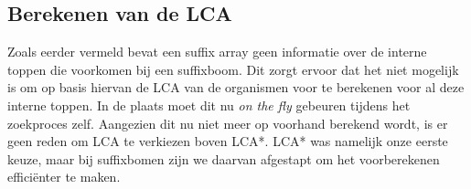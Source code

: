 \subsection{Berekenen van de LCA}\label{subsec:berekenen-van-de-lca}
Zoals eerder vermeld bevat een suffix array geen informatie over de interne toppen die voorkomen bij een suffixboom.
Dit zorgt ervoor dat het niet mogelijk is om op basis hiervan de LCA van de organismen voor te berekenen voor al deze interne toppen.
In de plaats moet dit nu \textit{on the fly} gebeuren tijdens het zoekproces zelf.
Aangezien dit nu niet meer op voorhand berekend wordt, is er geen reden om LCA te verkiezen boven LCA*.
LCA* was namelijk onze eerste keuze, maar bij suffixbomen zijn we daarvan afgestapt om het voorberekenen efficiënter te maken.




